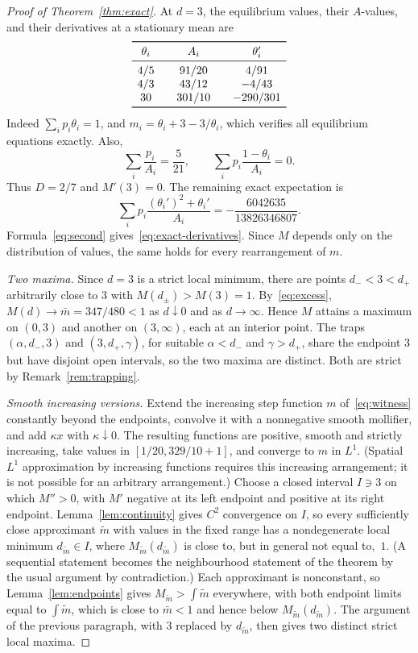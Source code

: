 \documentclass[11pt]{article}
\theoremstyle{remark}
\begin{document}
\begin{proof}[Proof of Theorem~\ref{thm:exact}]
At \(d=3\), the equilibrium values, their \(A\)-values, and their
derivatives at a stationary mean are
\[
\begin{array}{c@{\qquad}c@{\qquad}c}
 \toprule
 \theta_i&A_i&\theta_i'\\
 \midrule
 4/5&91/20&4/91\\
 4/3&43/12&-4/43\\
 30&301/10&-290/301\\
 \bottomrule
\end{array}
\]
Indeed \(\sum_i p_i\theta_i=1\), and
\(m_i=\theta_i+3-3/\theta_i\), which verifies all equilibrium equations
exactly. Also,
\[
 \sum_i\frac{p_i}{A_i}=\frac5{21},\qquad
 \sum_i p_i\frac{1-\theta_i}{A_i}=0.
\]
Thus \(D=2/7\) and \(M'(3)=0\). The remaining exact expectation is
\[
 \sum_i p_i\frac{(\theta_i')^2+\theta_i'}{A_i}
   =-\frac{6042635}{13826346807}.
\]
Formula~\eqref{eq:second} gives~\eqref{eq:exact-derivatives}. Since \(M\)
depends only on the distribution of values, the same holds for every
rearrangement of \(m\).

\emph{Two maxima.} Since \(d=3\) is a strict local minimum, there are
points \(d_-<3<d_+\) arbitrarily close to \(3\) with
\(M(d_\pm)>M(3)=1\). By~\eqref{eq:excess}, \(M(d)\to\bar m=347/480<1\) as
\(d\downarrow0\) and as \(d\to\infty\). Hence \(M\) attains a maximum
on \((0,3)\) and another on \((3,\infty)\), each at an interior point.
The traps \((\alpha,d_-,3)\) and \((3,d_+,\gamma)\), for suitable
\(\alpha<d_-\) and \(\gamma>d_+\), share the endpoint \(3\) but have disjoint
open intervals, so the two maxima are distinct. Both are strict by
Remark~\ref{rem:trapping}.

\emph{Smooth increasing versions.} Extend the increasing step function
\(m\) of~\eqref{eq:witness} constantly beyond the endpoints, convolve it
with a nonnegative smooth mollifier, and add \(\kappa x\) with \(\kappa\downarrow0\).
The resulting functions are positive, smooth and strictly increasing,
take values in \([1/20,329/10+1]\), and converge to \(m\) in \(L^1\).
(Spatial \(L^1\) approximation by increasing functions requires this
increasing arrangement; it is not possible for an arbitrary arrangement.)
Choose a closed interval \(I\ni3\) on which \(M''>0\), with \(M'\) negative
at its left endpoint and positive at its right endpoint.
Lemma~\ref{lem:continuity} gives \(C^2\) convergence on \(I\), so every
sufficiently close approximant \(\tilde m\) with values in the fixed range
has a nondegenerate local minimum \(d_{\tilde m}\in I\), where
\(M_{\tilde m}(d_{\tilde m})\) is close to, but in general not equal
to,~\(1\). (A sequential statement becomes the neighbourhood statement of
the theorem by the usual argument by contradiction.) Each approximant is nonconstant, so
Lemma~\ref{lem:endpoints} gives \(M_{\tilde m}>\int\tilde m\) everywhere,
with both endpoint limits equal to \(\int\tilde m\), which is close to
\(\bar m<1\) and hence below \(M_{\tilde m}(d_{\tilde m})\). The argument of
the previous paragraph, with \(3\) replaced by \(d_{\tilde m}\), then gives
two distinct strict local maxima.
\end{proof}
\end{document}
